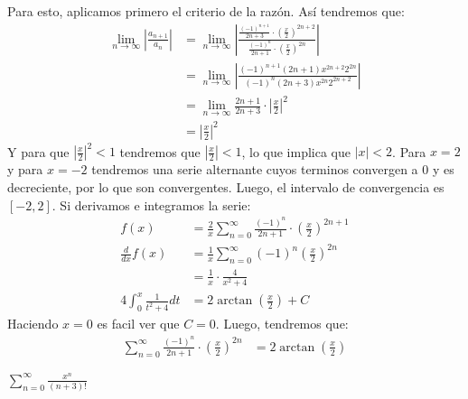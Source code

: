 \documentclass[../main.tex]{subfiles}
\begin{document}
Para esto, aplicamos primero el criterio de la razón. Así tendremos que:
\begin{align*}
    \lim_{n \to \infty} \left|\frac{a_{n+1}}{a_n}\right| &= \lim_{n \to \infty} \left|\frac{\frac{(-1)^{n+1}}{2n+3} \cdot \left(\frac{x}{2}\right)^{2n+2}}{\frac{(-1)^n}{2n+1} \cdot \left(\frac{x}{2}\right)^{2n}}\right|\\
    &= \lim_{n \to \infty} \left|\frac{(-1)^{n+1} (2n+1) x^{2n+2} 2^{2n}}{(-1)^n (2n+3) x^{2n} 2^{2n+2}}\right|\\
    &= \lim_{n \to \infty} \frac{2n+1}{2n+3} \cdot \left|\frac{x}{2}\right|^2\\
    &= \left|\frac{x}{2}\right|^2
\end{align*}
Y para que $\left|\frac{x}{2}\right|^2 < 1$ tendremos que $\left|\frac{x}{2}\right| < 1$, lo que implica que $|x| < 2$. Para $x = 2$ y para $x=-2$ tendremos una serie alternante cuyos terminos convergen a $0$ y es decreciente, por lo que son convergentes. Luego, el intervalo de convergencia es $[-2, 2]$. Si derivamos e integramos la serie:
\begin{align*}
    f(x) &= \frac{2}{x}\sum\limits_{n = 0}^\infty \frac{(-1)^n}{2n+1} \cdot \left(\frac{x}{2}\right)^{2n+1}\\
    \frac{d}{dx} f(x) &= \frac{1}{x} \sum\limits_{n = 0}^\infty (-1)^n \left(\frac{x}{2}\right)^{2n}\\
    &= \frac{1}{x} \cdot \frac{4}{x^2+4}\\
    4\int_{0}^x \frac{1}{t^2+4} dt &= 2\arctan\left(\frac{x}{2}\right) + C
\end{align*}
Haciendo $x = 0$ es facil ver que $C =0$. Luego, tendremos que:
\begin{align*}
    \sum\limits_{n = 0}^\infty \frac{(-1)^n}{2n+1} \cdot \left(\frac{x}{2}\right)^{2n}&= 2\arctan\left(\frac{x}{2}\right)
\end{align*}

\question $\sum\limits_{n = 0}^\infty \frac{x^n}{(n+3)!}$\\
\end{document}

